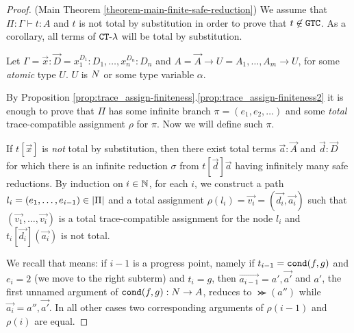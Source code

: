 \begin{proof}(Main Theorem \ref{theorem-main-finite-safe-reduction})
  We assume that $\Pi:\Gamma \vdash t: A$ 
  and $t$ is not total by substitution in order to prove that
  $t \not \in {\tt GTC}$. As a corollary, all terms of ${ {\tt CT}\mbox{-}\lambda}$ will be total by substitution.
 
  Let $\Gamma = \vec{x}:\vec{D} = x_1^{D_1}:D_1, \ldots, x_n^{D_n}:D_n$ 
  and $A = \vec{A}\rightarrow U = A_1, \ldots, A_m \rightarrow U$, 
  for some \emph{atomic} type $U$. $U$ is ${N}$ or some type variable $\alpha$.
   
  By Proposition \ref{prop:trace_assign-finiteness}.\ref{prop:trace_assign-finiteness2} 
  it is enough to prove that
  $\Pi$ has some infinite branch $\pi=(e_1, e_2, \ldots)$ 
  and some \emph{total} trace-compatible assignment $\rho$ for $\pi$.
  Now we will define such $\pi$.
  
  If $t[\vec{x}]$ is \emph{not} total by substitution, then 
  there exist total terms $\vec{a}:\vec{A}$ and $\vec{d}:\vec{D}$ for which there is
  an infinite reduction $\sigma$ from $t[\vec{d}]\vec{a}$ having infinitely many safe  
  reductions.
  By induction on $i \in \mathbb{N}$, for each $i$, we construct a path 
  $l_i = (e_1,\ldots,e_{i-1}) \in {|\Pi|}$
  and a total assignment $\rho(l_i) = \vec{v_i} = (\vec{d_i},\vec{a_i})$ such that
  $(\vec{v_1},\ldots,\vec{v_i})$ is a total trace-compatible assignment for the node $l_i$
  and $t_{i}[\vec{d_{i}}](\vec{a_{i}})$ is not total.

  
 We recall that  means: 
 if $i-1$ is a progress point, namely if $t_{i-1}={\tt cond}(f,g)$ and $e_i=2$ 
 (we move to the right subterm) and $t_i=g$, then $\vec{a_{i-1}} = a',\vec{a'}$ 
 and $a'$, the first unnamed argument of ${\tt cond}(f,g) : {N} \rightarrow A$, 
 reduces to $\Succ(a'')$ while $\vec{a_i} = a'',\vec{a'}$.
 In all other cases two corresponding arguments of $\rho(i-1)$ and $\rho(i)$ are equal.


\end{proof}

